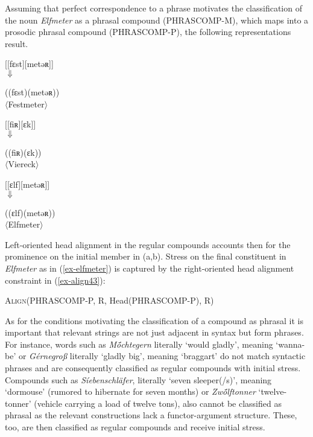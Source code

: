 \documentclass[output=paper
 ,nobabel
 ,draftmode
 ,colorlinks, citecolor=brown
]{langscibook}
\begin{document}
Assuming that perfect correspondence to a phrase motivates the classification of the noun \emph{Elfmeter} as a phrasal compound (PHRASCOMP-M), which maps into a prosodic phrasal compound (PHRASCOMP-P), the following representations result.

\eal
\ex\label{ex-festmeter}
{[[fɛst][metəʀ]]}\\
\hphantom{[[fɛst]\sub{STM}} $\Downarrow$

((fɛst)(metəʀ))\\
$\langle$Festmeter$\rangle$

\ex\label{ex-viereck-comp}
[[fiʀ][ɛk]]\\
\hphantom{[[fɛst]\sub{STM}} $\Downarrow$

((fiʀ)(ɛk))\\
$\langle$Viereck$\rangle$


\ex\label{ex-elfmeter}
[[ɛlf][metəʀ]]\\
\hphantom{[[fɛst]\sub{STM}} $\Downarrow$

((ɛlf)(metəʀ))\\
$\langle$Elfmeter$\rangle$
\zl

\noindent
Left-oriented head alignment in the regular compounds accounts then for the prominence on the initial member in (a,b).
Stress on the final constituent in \emph{Elfmeter} as in (\ref{ex-elfmeter})
is captured by the right-oriented head alignment constraint in (\ref{ex-align43}):

\ea\label{ex-align43}
\textsc{Align}(PHRASCOMP-P, R, Head(PHRASCOMP-P), R)
\z

\noindent
As for the conditions motivating the classification of a compound as phrasal it is important that relevant strings are not just adjacent in syntax but form phrases. For instance, words such as \emph{Mö́chtegern} literally `would gladly', meaning `wanna-be' or \emph{Gérnegroß} literally `gladly big', meaning `braggart' do not match syntactic phrases and are consequently classified as regular compounds with initial stress. Compounds such as \emph{Síebenschläfer}, literally `seven sleeper(/s)', meaning `dormouse' (rumored to hibernate for seven months) or \emph{Zwö́lftonner} `twelve-tonner' (vehicle carrying a load of twelve tons), also cannot be classified as phrasal as the relevant constructions lack a functor-argument structure. These, too, are then classified as regular compounds and receive initial stress.
\end{document}
